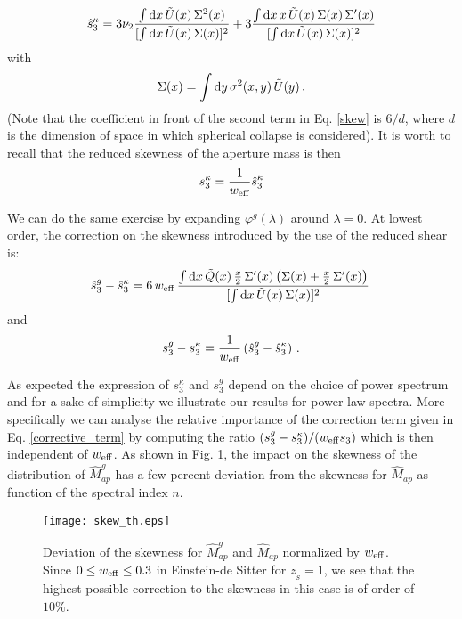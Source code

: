 \documentclass[twocolumn,aps,reprint, nofootinbib]{revtex4}
\newcommand{\dd}{{\rm d}}
\newcommand{\eff}{{\rm eff}}
\newcommand{\w}{{w_{\eff}}}
\newcommand{\tU}{\tilde{U}}
\newcommand{\tQ}{\tilde{Q}}
\newcommand{\Map}{\hat{M}_{ap}}
\newcommand{\Mapg}{\hat{M}_{ap}^g}
\newcommand{\varphir}{\varphi^{g}}
\begin{document}
\begin{equation}
\label{skew}
\hat{s}_3^\kappa = 3 \nu_2 \frac{ \int \dd x \, \tU(x) \, \Sigma^2(x)}{[\int \dd x \, \tU(x) \, \Sigma(x)]^2} + 3 \frac{ \int \dd x \, x \, \tU(x) \, \Sigma(x) \, \Sigma'(x)}{[\int \dd x \, \tU(x) \,  \Sigma(x)]^2}
\end{equation}
with
\begin{equation}
\Sigma(x) = \int \dd y \, \sigma^2 (x, y) \, \tU(y) \, .
\end{equation}
(Note that the coefficient in front of the second term in Eq. \eqref{skew} is $6/d$, where $d$ is the dimension of space in which spherical collapse is considered).
It is worth to recall that the reduced skewness of the aperture mass is then
\begin{equation}
s_3^\kappa = \frac{1}{\w} \hat{s}_{3}^\kappa
\end{equation}


We can do the same exercise by expanding $\varphir(\lambda)$ around $\lambda=0$. At lowest order, the correction on the skewness introduced by the use of the reduced shear is:
\begin{equation}
\label{corrective_term}
\hat{s}_3^g - \hat{s}_3^\kappa = 6 \, \w \, \frac{\int \dd x \, \tQ(x) \, \frac{x}{2} \, \Sigma'(x) \left( \Sigma(x) + \frac{x}{2} \, \Sigma'(x) \right)}{[\int \dd x \, \tU(x) \,  \Sigma(x)]^2} \, 
\end{equation}
and
\begin{equation}
{s}_3^g - {s}_3^\kappa=\frac{1}{\w}\left(\hat{s}_3^g - \hat{s}_3^\kappa \right)\,.
\end{equation}

As expected the expression of $s_{3}^\kappa$ and ${s}_3^g$ depend on the choice of power spectrum and for a sake of simplicity we illustrate our results for power law spectra. More specifically we can analyse the relative importance of the correction term given in Eq. \eqref{corrective_term} by computing the ratio $({s}_3^g - {s}_3^\kappa)/(\w {s}_3)$ which is then independent of $\w$. As shown in Fig. \ref{skew_th}, the impact on the skewness of the distribution of $\Mapg$ has a few percent deviation from the skewness for $\Map$ as function of the spectral index $n$.
\begin{figure}[!ht]
\centering
\texttt{[image: skew\_th.eps]}
\caption{Deviation of the skewness for $\Mapg$ and $\Map$ normalized by $\w$. Since $0 \leq \w \leq 0.3$ in Einstein-de Sitter for $z_{_S}=1$, we see that the highest possible correction to the skewness in this case is of order of $10\%$.}
\label{skew_th}
\end{figure}
\end{document}
